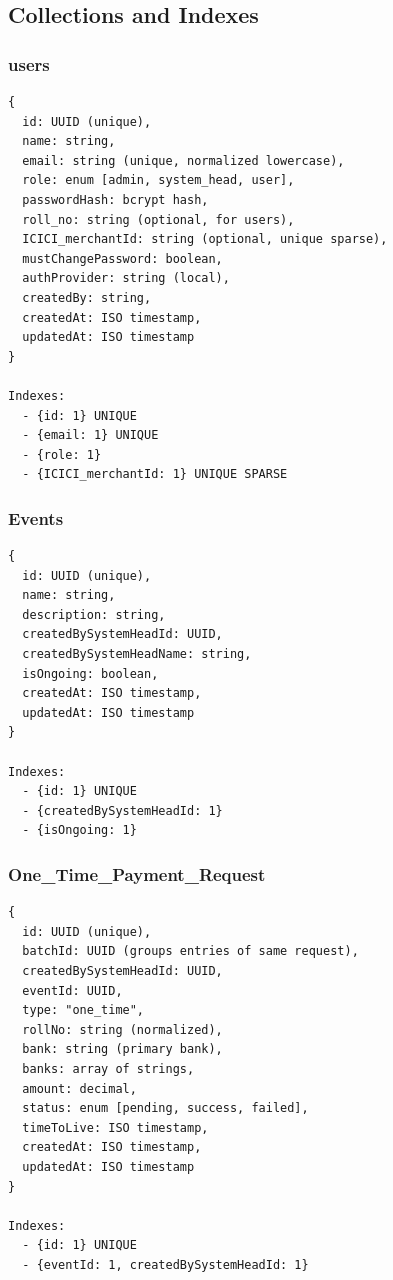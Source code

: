 \documentclass[12pt,a4paper]{article}
\begin{document}
\subsection{Collections and Indexes}

\subsubsection{users}
\begin{lstlisting}
{
  id: UUID (unique),
  name: string,
  email: string (unique, normalized lowercase),
  role: enum [admin, system_head, user],
  passwordHash: bcrypt hash,
  roll_no: string (optional, for users),
  ICICI_merchantId: string (optional, unique sparse),
  mustChangePassword: boolean,
  authProvider: string (local),
  createdBy: string,
  createdAt: ISO timestamp,
  updatedAt: ISO timestamp
}

Indexes:
  - {id: 1} UNIQUE
  - {email: 1} UNIQUE
  - {role: 1}
  - {ICICI_merchantId: 1} UNIQUE SPARSE
\end{lstlisting}

\subsubsection{Events}
\begin{lstlisting}
{
  id: UUID (unique),
  name: string,
  description: string,
  createdBySystemHeadId: UUID,
  createdBySystemHeadName: string,
  isOngoing: boolean,
  createdAt: ISO timestamp,
  updatedAt: ISO timestamp
}

Indexes:
  - {id: 1} UNIQUE
  - {createdBySystemHeadId: 1}
  - {isOngoing: 1}
\end{lstlisting}

\subsubsection{One\_Time\_Payment\_Request}
\begin{lstlisting}
{
  id: UUID (unique),
  batchId: UUID (groups entries of same request),
  createdBySystemHeadId: UUID,
  eventId: UUID,
  type: "one_time",
  rollNo: string (normalized),
  bank: string (primary bank),
  banks: array of strings,
  amount: decimal,
  status: enum [pending, success, failed],
  timeToLive: ISO timestamp,
  createdAt: ISO timestamp,
  updatedAt: ISO timestamp
}

Indexes:
  - {id: 1} UNIQUE
  - {eventId: 1, createdBySystemHeadId: 1}
\end{lstlisting}
\end{document}
